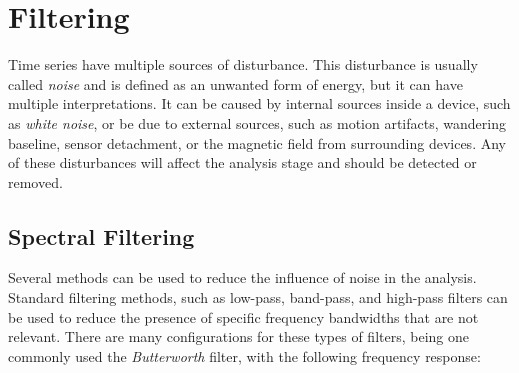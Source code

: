 %
%

\section{Filtering}
\label{sec:filt}

Time series have multiple sources of disturbance. This disturbance is usually called \textit{noise} and is defined as an unwanted form of energy, but it can have multiple interpretations. It can be caused by internal sources inside a device, such as \textit{white noise}, or be due to external sources, such as motion artifacts, wandering baseline, sensor detachment, or the magnetic field from surrounding devices. Any of these disturbances will affect the analysis stage and should be detected or removed.

\subsection{Spectral Filtering}
\label{subsec:spec_filt}
Several methods can be used to reduce the influence of noise in the analysis. Standard filtering methods, such as low-pass, band-pass, and high-pass filters can be used to reduce the presence of specific frequency bandwidths that are not relevant. There are many configurations for these types of filters, being one commonly used the \textit{Butterworth} filter, with the following frequency response:

